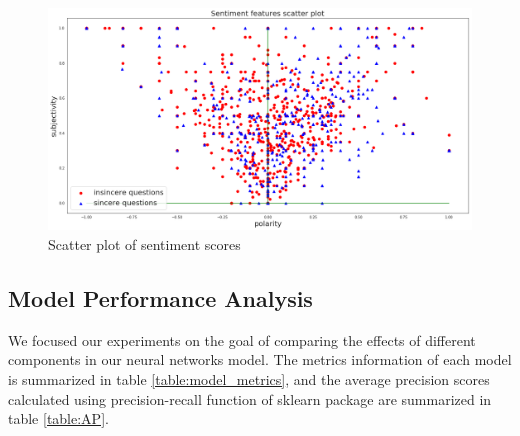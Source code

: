\documentclass[12pt]{diazessay} %
\begin{document}
\begin{figure}
     \includegraphics[width=\textwidth]{graphs/sentiment_scatter.png}
     \caption{Scatter plot of sentiment scores}
     \label{sentiment_scatter}
 \end{figure} 


\subsection{Model Performance Analysis} %
\label{sub:model_performance_analysis}

We focused our experiments on the goal of comparing the effects of different components in our neural networks model. The metrics information of each model is summarized in table \ref{table:model_metrics}, and the average precision scores calculated using precision-recall function of sklearn package are summarized in table \ref{table:AP}.
\end{document}
